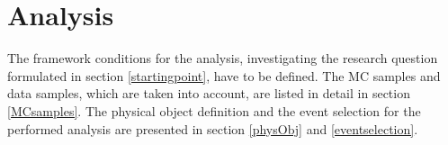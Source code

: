 \chapter{Analysis}
The framework conditions for the analysis, investigating the research question formulated in section \ref{startingpoint}, have to be defined. 
The MC samples and data samples, which are taken into account, are listed in detail in section \ref{MCsamples}. The physical object definition and the event selection for the performed analysis are presented in section \ref{physObj} and \ref{eventselection}.  
